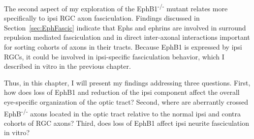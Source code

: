 The second aspect of my exploration of the EphB1\textsuperscript{-/-} mutant relates more specifically to ipsi RGC axon fasciculation.
Findings discussed in Section~\ref{sec:EphFascic} indicate that Ephs and ephrins are involved in surround repulsion mediated fasciculation and in direct inter-axonal interactions important for sorting cohorts of axons in their tracts.
Because EphB1 is expressed by ipsi RGCs, it could be involved in ipsi-specific fasciculation behavior, which I described in vitro in the previous chapter.

Thus, in this chapter, I will present my findings addressing three questions.
First, how does loss of EphB1 and reduction of the ipsi component affect the overall eye-specific organization of the optic tract?
Second, where are aberrantly crossed EphB\textsuperscript{-/-} axons located in the optic tract relative to the normal ipsi and contra cohorts of RGC axons?
Third, does loss of EphB1 affect ipsi neurite fasciculation in vitro?
